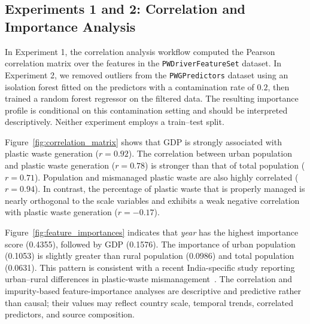 \subsection{Experiments 1 and 2: Correlation and Importance Analysis}

In Experiment 1, the correlation analysis workflow computed the Pearson correlation matrix over the features in the \texttt{PWDriverFeatureSet} dataset. In Experiment 2, we removed outliers from the \texttt{PWGPredictors} dataset using an isolation forest fitted on the predictors with a contamination rate of \(0.2\), then trained a random forest regressor on the filtered data. The resulting importance profile is conditional on this contamination setting and should be interpreted descriptively. Neither experiment employs a train--test split.



Figure~\ref{fig:correlation_matrix} shows that GDP is strongly associated with plastic waste generation (\(r = 0.92\)). The correlation between urban population and plastic waste generation (\(r = 0.78\)) is stronger than that of total population (\(r = 0.71\)). Population and mismanaged plastic waste are also highly correlated (\(r = 0.94\)). In contrast, the percentage of plastic waste that is properly managed is nearly orthogonal to the scale variables and exhibits a weak negative correlation with plastic waste generation (\(r = -0.17\)).

Figure~\ref{fig:feature_importances} indicates that \textit{year} has the highest importance score (0.4355), followed by GDP (0.1576). The importance of urban population (0.1053) is slightly greater than rural population (0.0986) and total population (0.0631). This pattern is consistent with a recent India-specific study reporting urban--rural differences in plastic-waste mismanagement~\cite{sen2026unveiling}. The correlation and impurity-based feature-importance analyses are descriptive and predictive rather than causal; their values may reflect country scale, temporal trends, correlated predictors, and source composition.



